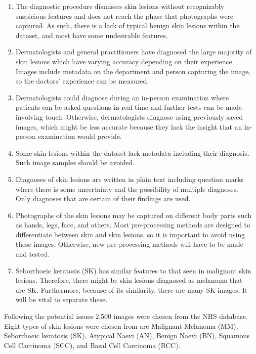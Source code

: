 \begin{enumerate}
    \item The diagnostic procedure dismisses skin lesions without recognizably suspicious features and does not reach the phase that photographs were captured. As such, there is a lack of typical benign skin lesions within the dataset, and most have some undesirable features.
    \item Dermatologists and general practitioners have diagnosed the large majority of skin lesions which have varying accuracy depending on their experience. Images include metadata on the department and person capturing the image, so the doctors' experience can be measured.
    \item Dermatologists could diagnose during an in-person examination where patients can be asked questions in real-time and further tests can be made involving touch. Otherwise, dermatologists diagnose using previously saved images, which might be less accurate because they lack the insight that an in-person examination would provide.
    \item Some skin lesions within the dataset lack metadata including their diagnosis. Such image samples should be avoided.
    \item Diagnoses of skin lesions are written in plain text including question marks where there is some uncertainty and the possibility of multiple diagnoses. Only diagnoses that are certain of their findings are used.
    \item Photographs of the skin lesions may be captured on different body parts such as hands, legs, face, and others. Most pre-processing methods are designed to differentiate between skin and skin lesions, so it is important to avoid using these images. Otherwise, new pre-processing methods will have to be made and tested.
    \item Seborrhoeic keratosis (SK) has similar features to that seen in malignant skin lesions. Therefore, there might be skin lesions diagnosed as melanoma that are SK. Furthermore, because of its similarity, there are many SK images. It will be vital to separate these.
\end{enumerate}

Following the potential issues 2,500 images were chosen from the NHS database. Eight types of skin lesions were chosen from are Malignant Melanoma (MM), Seborrhoeic keratosis (SK), Atypical Naevi (AN), Benign Naevi (BN), Squamous Cell Carcinoma (SCC), and Basal Cell Carcinoma (BCC).

